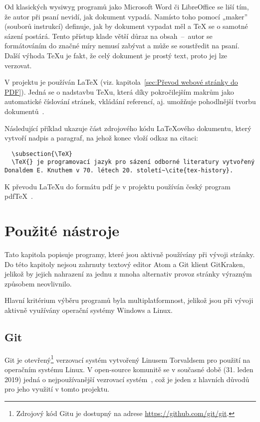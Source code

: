 \documentclass[a4paper, 12pt]{article}
\newcommand*{\fullref}[1]{\hyperref[{#1}]{\ref*{#1}}}
\begin{document}
  Od klasických \gls{wysiwyg} programů jako Microsoft Word či LibreOffice se liší tím, že autor při psaní nevidí, jak dokument vypadá. Namísto toho pomocí „maker” (souborů instrukcí) definuje, jak by dokument vypadat měl a \TeX{} se o samotné sázení postárá. Tento přístup klade větší důraz na obsah~--~autor se formátováním do značné míry nemusí zabývat a může se soustředit na psaní. Další výhoda \TeX u je fakt, že celý dokument je prostý text, proto jej lze verzovat.

  V projektu je používán \LaTeX{} (viz. kapitola~\fullref{sec:Převod webové stránky do PDF}). Jedná se o nadstavbu \TeX u, která díky pokročilejším makrům jako automatické číslování stránek, vkládání referencí, aj. umožňuje pohodlnější tvorbu dokumentů~\cite{getting-started-with-latex}.

  Následující příklad ukazuje část zdrojového kódu \LaTeX ového dokumentu, který vytvoří nadpis a paragraf, na jehož konec vloží odkaz na citaci:

  \begin{verbatim}
  \subsection{\TeX}
  \TeX{} je programovací jazyk pro sázení odborné literatury vytvořený Donaldem E. Knuthem v 70. létech 20. století~\cite{tex-history}.
  \end{verbatim}

  K převodu \LaTeX u do formátu \gls{pdf} je v projektu používán český program pdf\TeX{}~\cite{pdftex}. %


  \section{Použité nástroje} \label{sec:Použité nástroje}
  Tato kapitola popisuje programy, které jsou aktivně používány při vývoji stránky. Do této kapitoly nejsou zahrnuty textový editor Atom a Git klient GitKraken, jelikož by jejich nahrazení za jednu z mnoha alternativ provoz stránky výrazným způsobem neovlivnilo.

  Hlavní kritérium výběru programů byla multiplatformnost, jelikož jsou při vývoji aktivně využívány operační systémy Windows a Linux.


  \subsection{Git} \label{sec:Git}
  Git je otevřený\footnote{Zdrojový kód Gitu je dostupný na adrese \url{https://github.com/git/git}.} verzovací systém vytvořený Linusem Torvaldsem pro použití na operačním systému Linux. V open-source komunitě se v současné době (31. leden 2019) jedná o nejpoužívanější vezrovací systém~\cite{version-control-usage-statistics}, což je jeden z hlavních důvodů pro jeho využití v tomto projektu.
\end{document}
